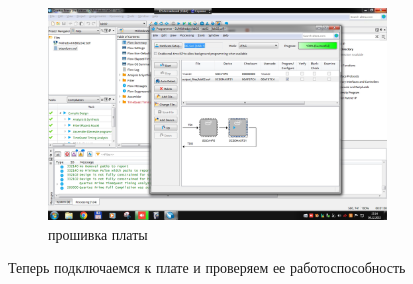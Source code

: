 \documentclass[a4paper]{article}
\begin{document}
  \begin{figure}[H]
    \centering
    \includegraphics[width=0.8\textwidth]{02_62}
    \caption{прошивка платы}
  \end{figure}

  Теперь подключаемся к плате и проверяем ее работоспособность
\end{document}
